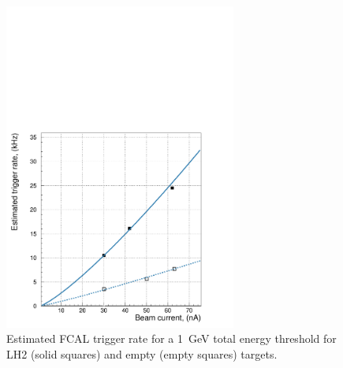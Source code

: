 \begin{figure}[tph]
\centering
\includegraphics[width=3in]{figures/fcalrate_vs_beam.pdf}
\caption{Estimated FCAL trigger rate for a 1~GeV
  total energy threshold for LH2 (solid squares) and empty
  (empty squares) targets.
\label{fig:fcalrate}}
\end{figure}

